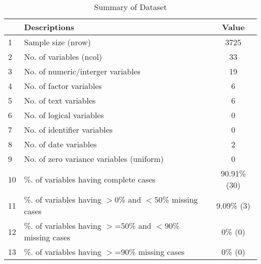 \begin{table}[ht]
\centering
\caption{Summary of Dataset} 
\begin{tabular}{llc}
  \hline
 & Descriptions & Value \\ 
  \hline
1 & Sample size (nrow) & 3725 \\ 
  2 & No. of variables (ncol) & 33 \\ 
  3 & No. of numeric/interger variables & 19 \\ 
  4 & No. of factor variables & 6 \\ 
  5 & No. of text variables & 6 \\ 
  6 & No. of logical variables & 0 \\ 
  7 & No. of identifier variables & 0 \\ 
  8 & No. of date variables & 2 \\ 
  9 & No. of zero variance variables (uniform) & 0 \\ 
  10 & \%. of variables having complete cases & 90.91\% (30) \\ 
  11 & \%. of variables having $>$0\% and $<$50\% missing cases & 9.09\% (3) \\ 
  12 & \%. of variables having $>$=50\% and $<$90\% missing cases & 0\% (0) \\ 
  13 & \%. of variables having $>$=90\% missing cases & 0\% (0) \\ 
   \hline
\end{tabular}
\end{table}
